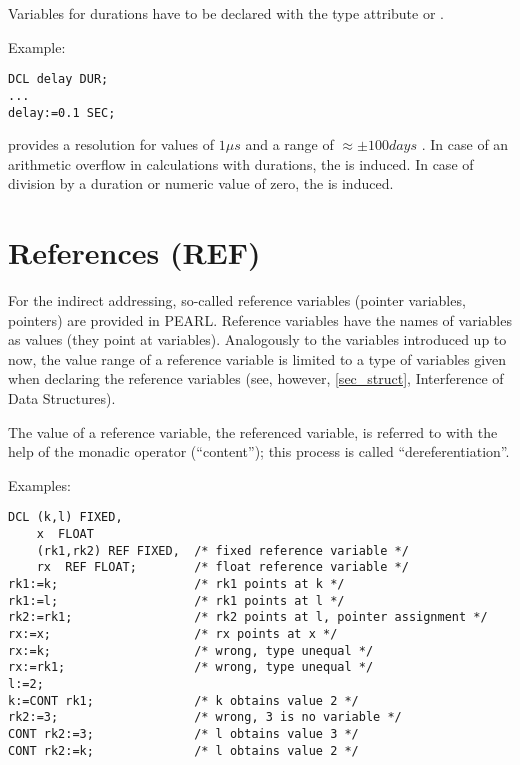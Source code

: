 Variables for durations have to be declared with the type attribute
 or .

\begin{grammarframe}

\end{grammarframe}

Example:

\begin{lstlisting}
DCL delay DUR;
...
delay:=0.1 SEC;
\end{lstlisting}

\OpenPEARL{} provides a resolution for  values of $1\mu s$ 
and
a range of $\approx \pm 100 days$ .
In case of an arithmetic overflow in calculations with durations, the
 is induced.
In case of division by a duration or numeric value of zero, 
the  is induced.

\section{References (REF)}  %
\label{sec_references}

For the indirect addressing, so-called reference variables (pointer
variables, pointers) are provided in PEARL. Reference variables have the
names of variables as values (they point at variables). Analogously to
the variables introduced up to now, the value range of a reference
variable is limited to a type of variables given when declaring the
reference variables (see, however, \ref{sec_struct}, Interference of Data
Structures).

The value of a reference variable, the referenced variable, is referred
to with the help of the monadic operator  (``content''); this
process is called ``dereferentiation''.

Examples:

\begin{lstlisting}
DCL (k,l) FIXED,
    x  FLOAT
    (rk1,rk2) REF FIXED,  /* fixed reference variable */ 
    rx  REF FLOAT;        /* float reference variable */ 
rk1:=k;                   /* rk1 points at k */ 
rk1:=l;                   /* rk1 points at l */
rk2:=rk1;                 /* rk2 points at l, pointer assignment */
rx:=x;                    /* rx points at x */ 
rx:=k;                    /* wrong, type unequal */ 
rx:=rk1;                  /* wrong, type unequal */
l:=2;      
k:=CONT rk1;              /* k obtains value 2 */
rk2:=3;                   /* wrong, 3 is no variable */ 
CONT rk2:=3;              /* l obtains value 3 */ 
CONT rk2:=k;              /* l obtains value 2 */ 
\end{lstlisting}

